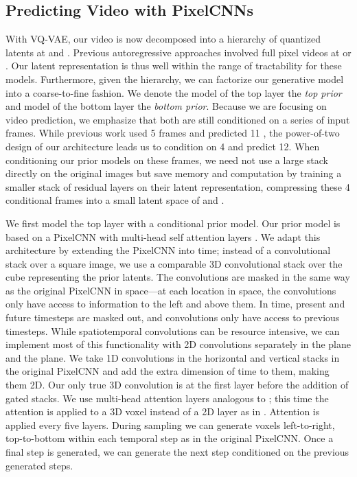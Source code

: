 \documentclass{article}
\begin{document}
\subsection{Predicting Video with PixelCNNs}
With VQ-VAE, our  video is now decomposed into a hierarchy of quantized latents at  and . Previous autoregressive approaches involved full pixel videos at  \cite{WeissenbornTU20} or   \cite{KalchbrennerOSD17}. Our latent representation is thus well within the range of tractability for these models. Furthermore, given the hierarchy, we can factorize our generative model into a coarse-to-fine fashion. We denote the model of the top layer the \emph{top prior} and model of the bottom layer the \emph{bottom prior}. Because we are focusing on video prediction, we emphasize that both are still conditioned on a series of input frames. While previous work used 5 frames and predicted 11 \cite{WeissenbornTU20, clark2020adversarial}, the power-of-two design of our architecture leads us to condition on 4 and predict 12. When conditioning our prior models on these frames, we need not use a large stack directly on the original images but save memory and computation by training a smaller stack of residual layers on their latent representation, compressing these 4 conditional frames into a small latent space of  and .

We first model the top layer with a conditional prior model. Our prior model is based on a PixelCNN with multi-head self attention layers \cite{ChenMRA18}. We adapt this architecture by extending the PixelCNN into time; instead of a convolutional stack over a square image, we use a comparable 3D convolutional stack over the cube representing the prior latents. The convolutions are masked in the same way as the original PixelCNN in space---at each location in space, the convolutions only have access to information to the left and above them. In time, present and future timesteps are masked out, and convolutions only have access to previous timesteps. While spatiotemporal convolutions can be resource intensive, we can implement most of this functionality with 2D convolutions separately in the  plane and the  plane. We take 1D convolutions in the horizontal and vertical stacks in the original PixelCNN \cite{OordKK16} and add the extra dimension of time to them, making them 2D. Our only true 3D convolution is at the first layer before the addition of gated stacks. We use multi-head attention layers analogous to \cite{RazaviOV19}; this time the attention is applied to a 3D voxel instead of a 2D layer as in \cite{RazaviOV19}. Attention is applied every five layers. During sampling we can generate voxels left-to-right, top-to-bottom within each temporal step as in the original PixelCNN. Once a final step is generated, we can generate the next step conditioned on the previous generated steps. 
\end{document}
